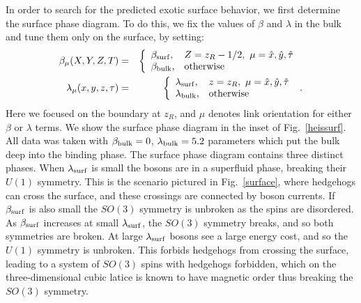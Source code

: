 \documentclass[prb,twocolumn]{revtex4-1}
\begin{document}
In order to search for the predicted\cite{SenthilVishwanath} exotic surface behavior, we first determine the surface phase diagram.
To do this, we fix the values of $\beta$ and $\lambda$ in the bulk and tune them only on the surface, by setting:
\begin{eqnarray}
\beta_\mu(X,Y,Z,T) &=&
\left\{
\begin{array}{ll}
\beta_{\rm surf}, & Z = z_R - 1/2, ~\mu=\hat{x},\hat{y},\hat{\tau}\\
\beta_{\rm bulk}, & {\rm otherwise}
\end{array}\right. ~
\label{bulkvsurf} \\
\lambda_\mu(x,y,z,\tau) &=&
\left\{
\begin{array}{ll}
\lambda_{\rm surf}, & z = z_R, ~\mu=\hat{x},\hat{y},\hat{\tau}\\
\lambda_{\rm bulk}, & {\rm otherwise }
\end{array}\right. ~.
\label{bulkvsurf}
\end{eqnarray}
Here we focused on the boundary at $z_R$, and $\mu$ denotes link orientation for either $\beta$ or $\lambda$ terms.  We show the surface phase diagram in the inset of Fig.~\ref{heissurf}.  All data was taken with $\beta_{\rm bulk}=0$, $\lambda_{\rm bulk}=5.2$ parameters which put the bulk deep into the binding phase.  The surface phase diagram contains three distinct phases. When $\lambda_{\rm surf}$ is small the bosons are in a superfluid phase, breaking their $U(1)$ symmetry. This is the scenario pictured in Fig.~\ref{surface}, where hedgehogs can cross the surface, and these crossings are connected by boson currents. If $\beta_{\rm surf}$ is also small the $SO(3)$ symmetry is unbroken as the spins are disordered. As $\beta_{\rm surf}$ increases at small $\lambda_{\rm surf}$, the $SO(3)$ symmetry breaks, and so both symmetries are broken. At large $\lambda_{\rm surf}$ bosons see a large energy cost, and so the $U(1)$ symmetry is unbroken. This forbids hedgehogs from crossing the surface, leading to a system of $SO(3)$ spins with hedgehogs forbidden, which on the three-dimensional cubic latice is known to have magnetic order thus breaking the $SO(3)$ symmetry.\cite{LauDasgupta, LesikAshvin} 
\end{document}
